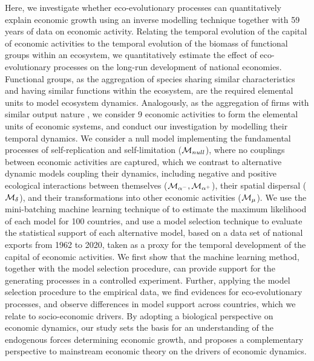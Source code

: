   Here, we investigate whether eco-evolutionary processes can quantitatively explain economic growth using an inverse modelling technique together with 59 years of data on economic activity. Relating the temporal evolution of the capital of economic activities to the temporal evolution of the biomass of functional groups within an ecosystem, we quantitatively estimate the effect of eco-evolutionary processes on the long-run development of national economies.
  Functional groups, as the aggregation of species sharing similar characteristics and having similar functions within the ecosystem, are the required elemental units to model ecosystem dynamics. Analogously, as the aggregation of firms with similar output nature \citep{Applegate2021}, we consider 9 economic activities to form the elemental units of economic systems, and conduct our investigation by modelling their temporal dynamics.
  We consider a null model implementing the fundamental processes of self-replication and self-limitation ($\mathcal{M}_{null}$), where no couplings between economic activities are captured, which we contrast to alternative dynamic models coupling their dynamics, including negative and positive ecological interactions between themselves ($\mathcal{M}_{\alpha^-},\mathcal{M}_{\alpha^+}$), their spatial dispersal ($\mathcal{M}_\delta$), and their transformations into other economic activities ($\mathcal{M}_\mu$).
  We use the mini-batching machine learning technique of \cite{Boussange2022a} to estimate the maximum likelihood of each model for 100 countries, and use a model selection technique to evaluate the statistical support of each alternative model, based on a data set of national exports from 1962 to 2020, taken as a proxy for the temporal development of the capital of economic activities. 
  We first show that the machine learning method, together with the model selection procedure, can provide support for the generating processes in a controlled experiment.
  Further, applying the model selection procedure to the empirical data, we find evidences for eco-evolutionary processes, and observe differences in model support across countries, which we relate to socio-economic drivers. 
  By adopting a biological perspective on economic dynamics, our study sets the basis for an understanding of the endogenous forces determining economic growth, and proposes a complementary perspective to mainstream economic theory on the drivers of economic dynamics.

